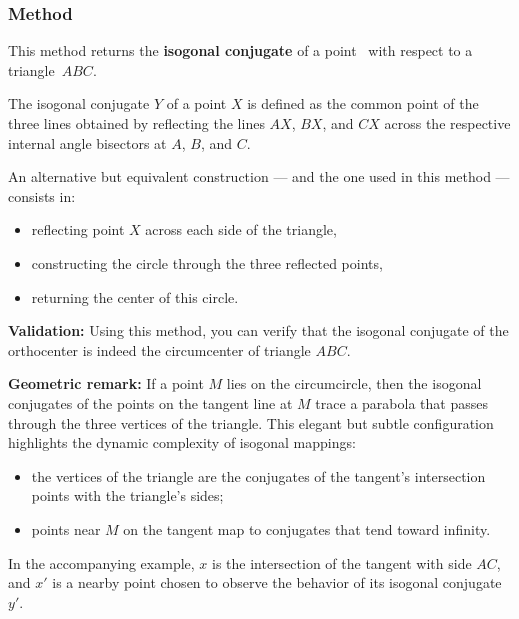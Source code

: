 \subsubsection{Method } %
\label{ssub:method_triangle_isogonal}

This method returns the \textbf{isogonal conjugate} of a point~ with respect to a triangle~$ABC$.

\medskip
\noindent
The isogonal conjugate $Y$ of a point $X$ is defined as the common point of the three lines obtained by reflecting the lines $AX$, $BX$, and $CX$ across the respective internal angle bisectors at $A$, $B$, and $C$.

\medskip
\noindent
An alternative but equivalent construction — and the one used in this method — consists in:
\begin{itemize}
  \item reflecting point $X$ across each side of the triangle,
  \item constructing the circle through the three reflected points,
  \item returning the center of this circle.
\end{itemize}

\medskip
\noindent
\textbf{Validation:} Using this method, you can verify that the isogonal conjugate of the orthocenter is indeed the circumcenter of triangle $ABC$.

\medskip
\noindent
\textbf{Geometric remark:} If a point $M$ lies on the circumcircle, then the isogonal conjugates of the points on the tangent line at $M$ trace a parabola that passes through the three vertices of the triangle. This elegant but subtle configuration highlights the dynamic complexity of isogonal mappings:
\begin{itemize}
  \item the vertices of the triangle are the conjugates of the tangent's intersection points with the triangle’s sides;
  \item points near $M$ on the tangent map to conjugates that tend toward infinity.
\end{itemize}

\medskip
\noindent
In the accompanying example, $x$ is the intersection of the tangent with side $AC$, and $x'$ is a nearby point chosen to observe the behavior of its isogonal conjugate $y'$.

\vspace{1em}

